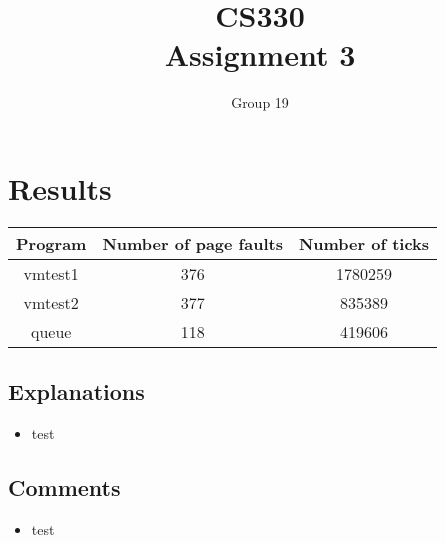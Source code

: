 \documentclass{article}
\author{Group 19}
\title{CS330 \\ Assignment 3}
\date{}
\begin{document}
\maketitle

\section{Results}
\begin{center}
\begin{tabular}{| c | c | c |}
\hline
\textbf{Program} & \textbf{Number of page faults} & \textbf{Number of ticks}\\
\hline
vmtest1 & 376 & 1780259 \\
\hline
vmtest2 & 377 & 835389 \\
\hline
queue & 118 & 419606 \\
\hline
\end{tabular}
\end{center}
\subsection{Explanations}
\begin{itemize}
\item test
\end{itemize}
\subsection{Comments}
\begin{itemize}
\item test
\end{itemize}
\end{document}
